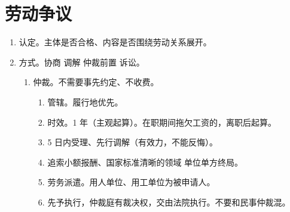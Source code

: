 \section{劳动争议}
\begin{enumerate}
  \item 认定。主体是否合格、内容是否围绕劳动关系展开。
  \item 方式。协商 \hz 调解 \hz 仲裁前置 \yjt 诉讼。
        \begin{enumerate}
          \item 仲裁。不需要事先约定、不收费。
                \begin{enumerate}
                  \item 管辖。履行地优先。
                  \item 时效。1 年（主观起算）。在职期间拖欠工资的，离职后起算。
                  \item 5 日内受理、先行调解（有效力，不能反悔）。
                  \item 追索小额报酬、国家标准清晰的领域 \yjt 单位单方终局。
                  \item 劳务派遣。用人单位、用工单位为被申请人。
                  \item 先予执行，仲裁庭有裁决权，交由法院执行。不要和民事仲裁混。
                \end{enumerate}
        \end{enumerate}
\end{enumerate}
